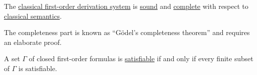 \begin{theorem}\label{thm:classical_first_order_logic_is_sound_and_complete}
  The \hyperref[def:first_order_derivation_system]{classical first-order derivation system} is \hyperref[def:derivability_and_satisfiability/soundness]{sound} and \hyperref[def:derivability_and_satisfiability/completeness]{complete} with respect to \hyperref[def:first_order_semantics]{classical semantics}.

  The completeness part is known as \enquote{G\"odel's completeness theorem} and requires an elaborate proof.
\end{theorem}

\smallskip

\begin{corollary}\label{thm:first_order_compactness_theorem}
  A set \( \Gamma \) of closed first-order formulas is \hyperref[def:propositional_semantics/satisfiability]{satisfiable} if and only if every finite subset of \( \Gamma \) is satisfiable.
\end{corollary}

